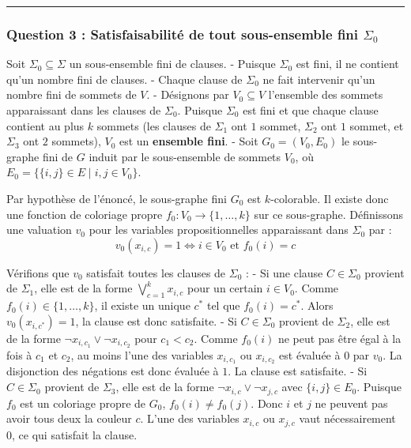 \documentclass[11pt,a4paper]{article}
\begin{document}
\begin{center}\rule{0.5\linewidth}{0.5pt}\end{center}

\hypertarget{question-3-satisfaisabilituxe9-de-tout-sous-ensemble-fini-sigma_0}{%
\subsubsection{\texorpdfstring{Question 3 : Satisfaisabilité de tout
sous-ensemble fini
\(\Sigma_0\)}{Question 3 : Satisfaisabilité de tout sous-ensemble fini \textbackslash Sigma\_0}}\label{question-3-satisfaisabilituxe9-de-tout-sous-ensemble-fini-sigma_0}}

Soit \(\Sigma_0 \subseteq \Sigma\) un sous-ensemble fini de clauses. -
Puisque \(\Sigma_0\) est fini, il ne contient qu'un nombre fini de
clauses. - Chaque clause de \(\Sigma_0\) ne fait intervenir qu'un nombre
fini de sommets de \(V\). - Désignons par \(V_0 \subseteq V\) l'ensemble
des sommets apparaissant dans les clauses de \(\Sigma_0\). Puisque
\(\Sigma_0\) est fini et que chaque clause contient au plus \(k\)
sommets (les clauses de \(\Sigma_1\) ont \(1\) sommet, \(\Sigma_2\) ont
\(1\) sommet, et \(\Sigma_3\) ont \(2\) sommets), \(V_0\) est un
\textbf{ensemble fini}. - Soit \(G_0 = (V_0, E_0)\) le sous-graphe fini
de \(G\) induit par le sous-ensemble de sommets \(V_0\), où
\(E_0 = \{\{i, j\} \in E \mid i, j \in V_0\}\).

Par hypothèse de l'énoncé, le sous-graphe fini \(G_0\) est
\(k\)-colorable. Il existe donc une fonction de coloriage propre
\(f_0 : V_0 \to \{1, \dots, k\}\) sur ce sous-graphe. Définissons une
valuation \(v_0\) pour les variables propositionnelles apparaissant dans
\(\Sigma_0\) par :
\[v_0(x_{i, c}) = 1 \iff i \in V_0 \text{ et } f_0(i) = c\]

Vérifions que \(v_0\) satisfait toutes les clauses de \(\Sigma_0\) : -
Si une clause \(C \in \Sigma_0\) provient de \(\Sigma_1\), elle est de
la forme \(\bigvee_{c=1}^k x_{i, c}\) pour un certain \(i \in V_0\).
Comme \(f_0(i) \in \{1, \dots, k\}\), il existe un unique \(c^*\) tel
que \(f_0(i) = c^*\). Alors \(v_0(x_{i, c^*}) = 1\), la clause est donc
satisfaite. - Si \(C \in \Sigma_0\) provient de \(\Sigma_2\), elle est
de la forme \(\neg x_{i, c_1} \lor \neg x_{i, c_2}\) pour \(c_1 < c_2\).
Comme \(f_0(i)\) ne peut pas être égal à la fois à \(c_1\) et \(c_2\),
au moins l'une des variables \(x_{i, c_1}\) ou \(x_{i, c_2}\) est
évaluée à \(0\) par \(v_0\). La disjonction des négations est donc
évaluée à \(1\). La clause est satisfaite. - Si \(C \in \Sigma_0\)
provient de \(\Sigma_3\), elle est de la forme
\(\neg x_{i, c} \lor \neg x_{j, c}\) avec \(\{i, j\} \in E_0\). Puisque
\(f_0\) est un coloriage propre de \(G_0\), \(f_0(i) \neq f_0(j)\). Donc
\(i\) et \(j\) ne peuvent pas avoir tous deux la couleur \(c\). L'une
des variables \(x_{i, c}\) ou \(x_{j, c}\) vaut nécessairement \(0\), ce
qui satisfait la clause.
\end{document}
